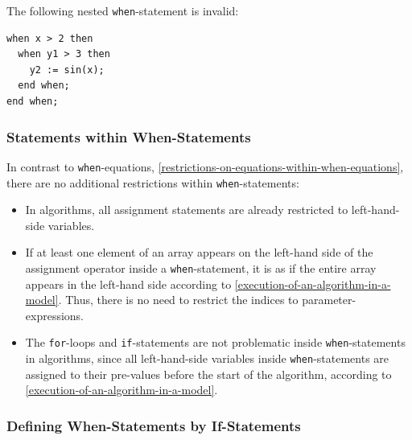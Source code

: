\begin{example}
The following nested \lstinline!when!-statement is invalid:
\begin{lstlisting}[language=modelica]
when x > 2 then
  when y1 > 3 then
    y2 := sin(x);
  end when;
end when;
\end{lstlisting}
\end{example}

\subsubsection{Statements within When-Statements}\label{restrictions-on-statements-within-when-statements}\label{statements-within-when-statements}

\begin{nonnormative}
In contrast to \lstinline!when!-equations, \cref{restrictions-on-equations-within-when-equations}, there are no additional restrictions within \lstinline!when!-statements:
\begin{itemize}
\item
  In algorithms, all assignment statements are already restricted to left-hand-side variables.
\item
  If at least one element of an array appears on the left-hand side of the assignment operator inside a \lstinline!when!-statement, it is as if the entire array appears in the left-hand side according to \cref{execution-of-an-algorithm-in-a-model}.
  Thus, there is no need to restrict the indices to parameter-expressions.
\item
  The \lstinline!for!-loops and \lstinline!if!-statements are not problematic inside \lstinline!when!-statements in algorithms, since all left-hand-side variables inside \lstinline!when!-statements are assigned to their pre-values before the start of the algorithm, according to \cref{execution-of-an-algorithm-in-a-model}.
\end{itemize}
\end{nonnormative}

\subsubsection{Defining When-Statements by If-Statements}\label{defining-when-statements-by-if-statements}

